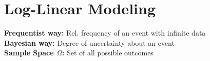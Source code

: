 \begin{comment}
	\pagebreak
\end{comment}

\section{Log-Linear Modeling}
\begin{comment}
\subsection{Structure}

	\begin{itemize}
	
	\item Probability refresher
	
	\item Log-Linear Models
	\begin{itemize}
	\item Why Log, Why Linear?
	\item Regression/ Classification
	\item Maximum Likelihood
	\end{itemize}
	
	\item Softmax
	\begin{itemize}
	\item Definition
	\item Gradient
	\end{itemize}
	
	\item Exponential Family
	\begin{itemize}
	\item Definition and Properties
	\item Conjugacy
	\item Max entropy derivation
	\item Connection to LL-Models
	\end{itemize}
	
	\end{itemize}
\end{comment}

\textbf{Frequentist way:} Rel. frequency of an event with infinite data\\

\textbf{Bayesian way:} Degree of uncertainty about an event\\

\textbf{Sample Space $\Omega$:} Set of all possible outcomes\\

